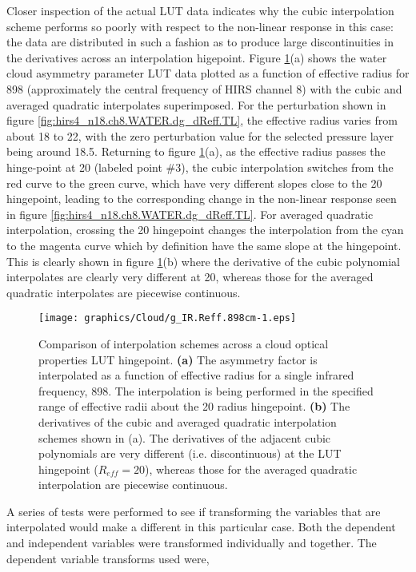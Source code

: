 Closer inspection of the actual LUT data indicates why the cubic interpolation scheme performs so poorly with respect to the non-linear response in this case: the data are distributed in such a fashion as to produce large discontinuities in the derivatives across an interpolation higepoint. Figure \ref{fig:g_IR.Reff.898cm-1}(a) shows the water cloud asymmetry parameter LUT data plotted as a function of effective radius for 898\invcm{} (approximately the central frequency of HIRS channel 8) with the cubic and averaged quadratic interpolates superimposed. For the perturbation shown in figure \ref{fig:hirs4_n18.ch8.WATER.dg_dReff.TL}, the effective radius varies from about 18 to 22\micron, with the zero perturbation value for the selected pressure layer being around 18.5\micron. Returning to figure \ref{fig:g_IR.Reff.898cm-1}(a), as the effective radius passes the hinge-point at 20\micron{} (labeled point \#3), the cubic interpolation switches from the red curve to the green curve, which have very different slopes close to the 20\micron{} hingepoint, leading to the corresponding change in the non-linear response seen in figure \ref{fig:hirs4_n18.ch8.WATER.dg_dReff.TL}. For averaged quadratic interpolation, crossing the 20\micron{} hingepoint changes the interpolation from the cyan to the magenta curve which by definition have the same slope at the hingepoint. This is clearly shown in figure \ref{fig:g_IR.Reff.898cm-1}(b) where the derivative of the cubic polynomial interpolates are clearly very different at 20\micron{}, whereas those for the averaged quadratic interpolates are piecewise continuous.

\begin{figure}[htp]
  \centering
  \texttt{[image: graphics/Cloud/g\_IR.Reff.898cm-1.eps]}
  \caption{Comparison of interpolation schemes across a cloud optical properties LUT hingepoint. \textbf{(a)} The asymmetry factor is interpolated as a function of effective radius for a single infrared frequency, 898\invcm. The interpolation is being performed in the specified range of effective radii about the 20\micron{} radius hingepoint. \textbf{(b)} The derivatives of the cubic and averaged quadratic interpolation schemes shown in (a). The derivatives of the adjacent cubic polynomials are very different (i.e. discontinuous) at the LUT hingepoint ($R_{eff}=20$\micron), whereas those for the averaged quadratic interpolation are piecewise continuous.}
  \label{fig:g_IR.Reff.898cm-1}
\end{figure}

A series of tests were performed to see if transforming the variables that are interpolated would make a different in this particular case. Both the dependent and independent variables were transformed individually and together. The dependent variable transforms\cite{Purser_Variable_Transform} used were,

